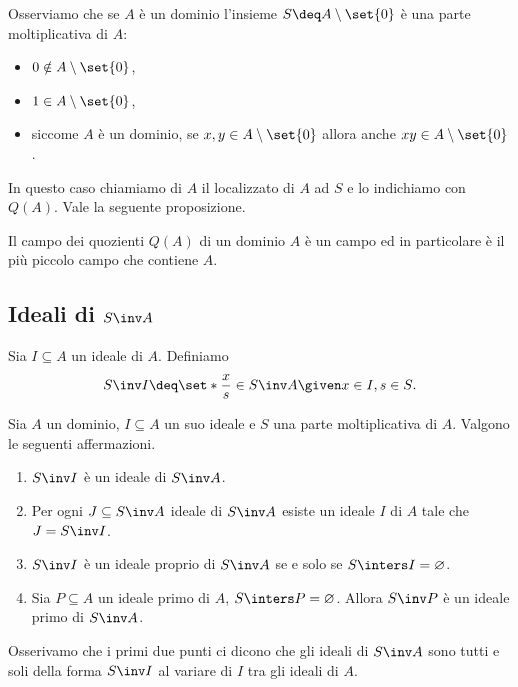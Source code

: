 Osserviamo che se $A$ è un dominio l'insieme $S \deq A \setminus \set{0}$ è una parte moltiplicativa di $A$:
\begin{itemize}
    \item $0 \notin A \setminus \set{0}$,
    \item $1 \in A \setminus \set{0}$,
    \item siccome $A$ è un dominio, se $x, y \in A \setminus \set{0}$ allora anche $xy \in A \setminus \set{0}$.
\end{itemize}

In questo caso chiamiamo  di $A$ il localizzato di $A$ ad $S$ e lo indichiamo con $Q(A)$. Vale la seguente proposizione.
\begin{proposition}
    Il campo dei quozienti $Q(A)$ di un dominio $A$ è un campo ed in particolare è il più piccolo campo che contiene $A$.
\end{proposition}

\subsection{Ideali di $S\inv A$}

Sia $I \subseteq A$ un ideale di $A$. Definiamo \[
    S\inv I \deq \set*{\frac{x}{s} \in S\inv A \given x \in I, s \in S}.    
\]

\begin{proposition}
    Sia $A$ un dominio, $I \subseteq A$ un suo ideale e $S$ una parte moltiplicativa di $A$. Valgono le seguenti affermazioni.
    \begin{enumerate}
        \item $S\inv I$ è un ideale di $S\inv A$.
        \item Per ogni $J \subseteq S\inv A$ ideale di $S\inv A$ esiste un ideale $I$ di $A$ tale che $J = S\inv I$.
        \item $S\inv I$ è un ideale proprio di $S\inv A$ se e solo se $S \inters I = \varnothing$.
        \item Sia $P \subseteq A$ un ideale primo di $A$, $S \inters P = \varnothing$. Allora $S\inv P$ è un ideale primo di $S\inv A$.
    \end{enumerate}
\end{proposition}

Osserivamo che i primi due punti ci dicono che gli ideali di $S\inv A$ sono tutti e soli della forma $S\inv I$ al variare di $I$ tra gli ideali di $A$.